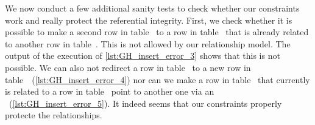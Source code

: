 We now conduct a few additional sanity tests to check whether our constraints work and really protect the referential integrity.
First, we check whether it is possible to make a second row in table~ to a row in table~ that is already related to another row in table~.
 This is not allowed by our relationship model.
The output of the execution of \cref{lst:GH_insert_error_3} shows that this is not possible.
We can also not redirect a row in table~ to a new row in table~~(\cref{lst:GH_insert_error_4}) nor can we make a row in table~ that currently is related to a row in table~ point to another one via an ~(\cref{lst:GH_insert_error_5}).
It indeed seems that our constraints properly protecte the relationships.%
\FloatBarrier%
\endhsection%
%
